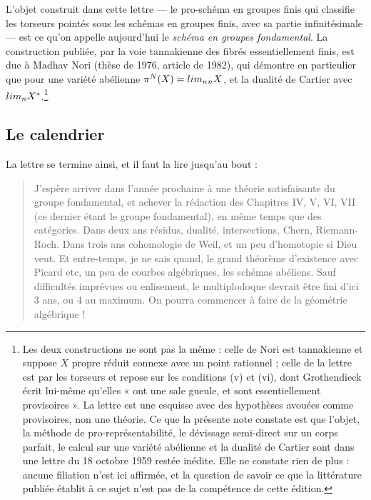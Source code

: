 \documentclass[11pt,a4paper]{article}
\begin{document}
L'objet construit dans cette lettre --- le pro-schéma en groupes finis qui
classifie les torseurs pointés sous les schémas en groupes finis, avec sa
partie infinitésimale --- est ce qu'on appelle aujourd'hui le \emph{schéma en
groupes fondamental}. La construction publiée, par la voie tannakienne des
fibrés essentiellement finis, est due à Madhav Nori (thèse de 1976, article de
1982), qui démontre en particulier que pour une variété abélienne
$\pi^{N}(X) = \varprojlim_{n} {}_{n}X$, et la dualité de Cartier avec
$\varinjlim {}_{n}X^{*}$.\footnote{Les deux constructions ne sont pas la même :
celle de Nori est tannakienne et suppose $X$ propre réduit connexe avec un
point rationnel ; celle de la lettre est par les torseurs et repose sur les
conditions (v) et (vi), dont Grothendieck écrit lui-même qu'elles « ont une
sale gueule, et sont essentiellement provisoires ». La lettre est une esquisse
avec des hypothèses avouées comme provisoires, non une théorie. Ce que la
présente note constate est que l'objet, la méthode de pro-représentabilité, le
dévissage semi-direct sur un corps parfait, le calcul sur une variété abélienne
et la dualité de Cartier sont dans une lettre du 18 octobre 1959 restée
inédite. Elle ne constate rien de plus : aucune filiation n'est ici affirmée,
et la question de savoir ce que la littérature publiée établit à ce sujet n'est
pas de la compétence de cette édition.}

\subsection*{Le calendrier}

La lettre se termine ainsi, et il faut la lire jusqu'au bout :

\begin{quote}
J'espère arriver dans l'année prochaine à une théorie satisfaisante du groupe
fondamental, et achever la rédaction des Chapitres IV, V, VI, VII (ce dernier
étant le groupe fondamental), en même temps que des catégories. Dans deux ans
résidus, dualité, intersections, Chern, Riemann-Roch. Dans trois ans
cohomologie de Weil, et un peu d'homotopie si Dieu veut. Et entre-temps, je ne
sais quand, le grand théorème d'existence avec Picard etc, un peu de courbes
algébriques, les schémas abéliens. Sauf difficultés imprévues ou enlisement, le
multiplodoque devrait être fini d'ici 3 ans, ou 4 au maximum. On pourra
commencer à faire de la géométrie algébrique !
\end{quote}

\end{document}

